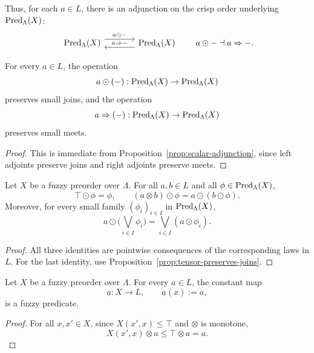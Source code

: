 Thus, for each \(a\in L\), there is an adjunction on the crisp order underlying \(\mathrm{Pred}_\Lambda(X)\):
\[
    \begin{tikzcd}[column sep=large]
        \Pred_\Lambda(X)
            \arrow[r,shift left=1.1ex,"a\odot -"]
        &
        \Pred_\Lambda(X)
            \arrow[l,shift left=1.1ex,"a\Rightarrow -"']
    \end{tikzcd}
    \qquad
    a\odot -\dashv a\Rightarrow - .
\]

\begin{corollary}
\label{cor:scalar-action-preserves-joins}
    For every \(a\in L\), the operation
    \[
        a\odot(-):\mathrm{Pred}_\Lambda(X)\to \mathrm{Pred}_\Lambda(X)
    \]
    preserves small joins, and the operation
    \[
        a\Rightarrow(-):\mathrm{Pred}_\Lambda(X)\to \mathrm{Pred}_\Lambda(X)
    \]
    preserves small meets.
\end{corollary}

\begin{proof}
    This is immediate from Proposition~\ref{prop:scalar-adjunction}, since left adjoints preserve joins and right adjoints preserve meets.
\end{proof}

\begin{proposition}
\label{prop:predicate-scalar-laws}
    Let \(X\) be a fuzzy preorder over \(\Lambda\). For all \(a,b\in L\) and all \(\phi\in \mathrm{Pred}_\Lambda(X)\),
    \[
        \top\odot \phi=\phi,
        \qquad
        (a\otimes b)\odot \phi=a\odot (b\odot \phi).
    \]
    Moreover, for every small family \((\phi_i)_{i\in I}\) in \(\mathrm{Pred}_\Lambda(X)\),
    \[
        a\odot \Big(\bigvee_{i\in I}\phi_i\Big)
        =
        \bigvee_{i\in I}(a\odot \phi_i).
    \]
\end{proposition}

\begin{proof}
    All three identities are pointwise consequences of the corresponding laws in \(L\). For the last identity, use Proposition~\ref{prop:tensor-preserves-joins}.
\end{proof}

\begin{proposition}
\label{prop:constant-fuzzy-predicates}
    Let \(X\) be a fuzzy preorder over \(\Lambda\). For every \(a\in L\), the constant map
    \[
        \underline a:X\to L,
        \qquad
        \underline a(x):=a,
    \]
    is a fuzzy predicate.
\end{proposition}

\begin{proof}
    For all \(x,x'\in X\), since \(X(x',x)\leq \top\) and \(\otimes\) is monotone,
    \[
        X(x',x)\otimes a
        \leq
        \top\otimes a
        =
        a.
    \]
\end{proof}

